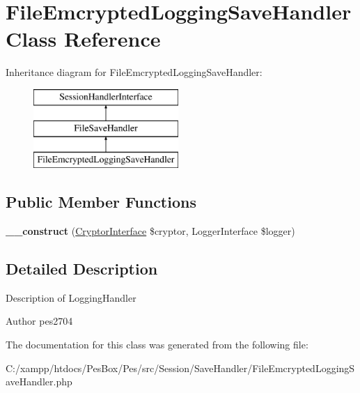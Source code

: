 \hypertarget{class_pes_1_1_session_1_1_save_handler_1_1_file_emcrypted_logging_save_handler}{}\section{File\+Emcrypted\+Logging\+Save\+Handler Class Reference}
\label{class_pes_1_1_session_1_1_save_handler_1_1_file_emcrypted_logging_save_handler}
Inheritance diagram for File\+Emcrypted\+Logging\+Save\+Handler\+:\begin{figure}[H]
\begin{center}
\leavevmode
\includegraphics[height=3.000000cm]{class_pes_1_1_session_1_1_save_handler_1_1_file_emcrypted_logging_save_handler}
\end{center}
\end{figure}
\subsection*{Public Member Functions}
\begin{DoxyCompactItemize}
\item 
\mbox{\label{class_pes_1_1_session_1_1_save_handler_1_1_file_emcrypted_logging_save_handler_a2015eacbce43cf3300c984467d6dd25a}} 
{\bfseries \+\_\+\+\_\+construct} (\mbox{\hyperlink{interface_pes_1_1_security_1_1_cryptor_1_1_cryptor_interface}{Cryptor\+Interface}} \$cryptor, Logger\+Interface \$logger)
\end{DoxyCompactItemize}


\subsection{Detailed Description}
Description of Logging\+Handler

\begin{DoxyAuthor}{Author}
pes2704 
\end{DoxyAuthor}


The documentation for this class was generated from the following file\+:\begin{DoxyCompactItemize}
\item 
C\+:/xampp/htdocs/\+Pes\+Box/\+Pes/src/\+Session/\+Save\+Handler/File\+Emcrypted\+Logging\+Save\+Handler.\+php\end{DoxyCompactItemize}
